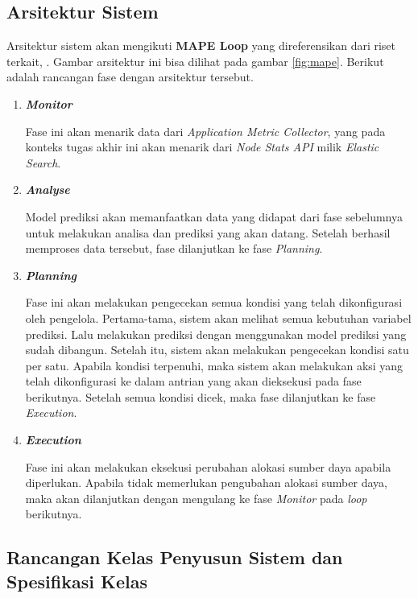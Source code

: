 \subsection{Arsitektur Sistem}
\label{sec:arsitektur-sistem}

Arsitektur sistem akan mengikuti \textbf{MAPE Loop} yang direferensikan dari riset terkait, \parencite{riset1}. Gambar arsitektur ini bisa dilihat pada gambar \ref{fig:mape}. Berikut adalah rancangan fase dengan arsitektur tersebut.

\begin{enumerate}
    \item \bfseries \textit{Monitor} \normalfont
    
        Fase ini akan menarik data dari \textit{Application Metric Collector}, yang pada konteks tugas akhir ini akan menarik dari \textit{Node Stats API} milik \textit{Elastic Search}.
    \item \bfseries \textit{Analyse} \normalfont
    
        Model prediksi akan memanfaatkan data yang didapat dari fase sebelumnya untuk melakukan analisa dan prediksi yang akan datang. Setelah berhasil memproses data tersebut, fase dilanjutkan ke fase \textit{Planning}.
    \item \bfseries \textit{Planning} \normalfont
    
        Fase ini akan melakukan pengecekan semua kondisi yang telah dikonfigurasi oleh pengelola. Pertama-tama, sistem akan melihat semua kebutuhan variabel prediksi. Lalu melakukan prediksi dengan menggunakan model prediksi yang sudah dibangun. Setelah itu, sistem akan melakukan pengecekan kondisi satu per satu. Apabila kondisi terpenuhi, maka sistem akan melakukan aksi yang telah dikonfigurasi ke dalam antrian yang akan dieksekusi pada fase berikutnya. Setelah semua kondisi dicek, maka fase dilanjutkan ke fase \textit{Execution}.
    \item \bfseries \textit{Execution} \normalfont
    
        Fase ini akan melakukan eksekusi perubahan alokasi sumber daya apabila diperlukan. Apabila tidak memerlukan pengubahan alokasi sumber daya, maka akan dilanjutkan dengan mengulang ke fase \textit{Monitor} pada \textit{loop} berikutnya.
\end{enumerate}

\subsection{Rancangan Kelas Penyusun Sistem dan Spesifikasi Kelas}


